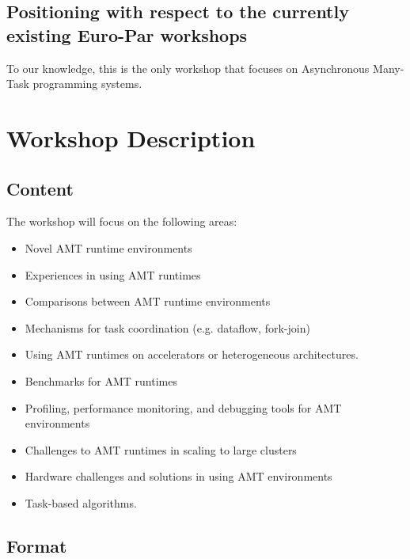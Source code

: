 \documentclass{article}
\begin{document}
\subsection*{Positioning with respect to the currently existing Euro-Par workshops}

To our knowledge, this is the only workshop that focuses on Asynchronous Many-Task programming systems.

\section*{Workshop Description}

\subsection*{Content}

The workshop will focus on the following areas:
\begin{itemize}
\item Novel AMT runtime environments
\item Experiences in using AMT runtimes
\item Comparisons between AMT runtime environments
\item Mechanisms for task coordination (e.g. dataflow, fork-join)
\item Using AMT runtimes on accelerators or heterogeneous architectures.
\item Benchmarks for AMT runtimes
\item Profiling, performance monitoring, and debugging tools for AMT environments
\item Challenges to AMT runtimes in scaling to large clusters
\item Hardware challenges and solutions in using AMT environments
\item Task-based algorithms.
\end{itemize}

\subsection*{Format}
\end{document}
